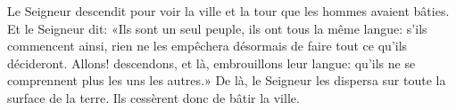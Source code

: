 Le Seigneur descendit pour voir la ville et la tour
	que les hommes avaient bâties.
Et le Seigneur dit: «Ils sont un seul peuple, ils ont tous la même langue:
	s’ils commencent ainsi, rien ne les empêchera désormais
	de faire tout ce qu’ils décideront.
Allons! descendons, et là, embrouillons leur langue:
	qu’ils ne se comprennent plus les uns les autres.»
De là, le Seigneur les dispersa sur toute la surface de la terre.
	Ils cessèrent donc de bâtir la ville.
